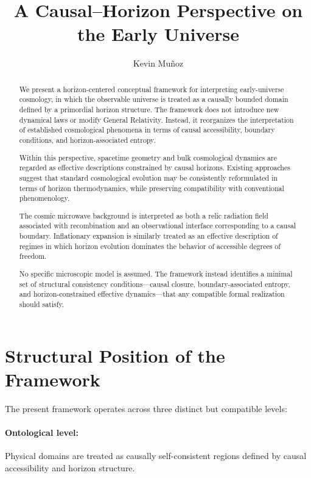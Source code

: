 \documentclass[12pt,a4paper]{article}
\title{A Causal--Horizon Perspective on the Early Universe}
\author{Kevin Mu\~noz}
\date{}
\begin{document}
\maketitle

\begin{abstract}
We present a horizon-centered conceptual framework for interpreting early-universe cosmology, in which the observable universe is treated as a causally bounded domain defined by a primordial horizon structure. The framework does not introduce new dynamical laws or modify General Relativity. Instead, it reorganizes the interpretation of established cosmological phenomena in terms of causal accessibility, boundary conditions, and horizon-associated entropy.

Within this perspective, spacetime geometry and bulk cosmological dynamics are regarded as effective descriptions constrained by causal horizons. Existing approaches suggest that standard cosmological evolution may be consistently reformulated in terms of horizon thermodynamics, while preserving compatibility with conventional phenomenology.

The cosmic microwave background is interpreted as both a relic radiation field associated with recombination and an observational interface corresponding to a causal boundary. Inflationary expansion is similarly treated as an effective description of regimes in which horizon evolution dominates the behavior of accessible degrees of freedom.

No specific microscopic model is assumed. The framework instead identifies a minimal set of structural consistency conditions---causal closure, boundary-associated entropy, and horizon-constrained effective dynamics---that any compatible formal realization should satisfy.
\end{abstract}

\setcounter{section}{-1}
\section{Structural Position of the Framework}

The present framework operates across three distinct but compatible levels:

\paragraph{Ontological level:} Physical domains are treated as causally self-consistent regions defined by causal accessibility and horizon structure.
\end{document}
